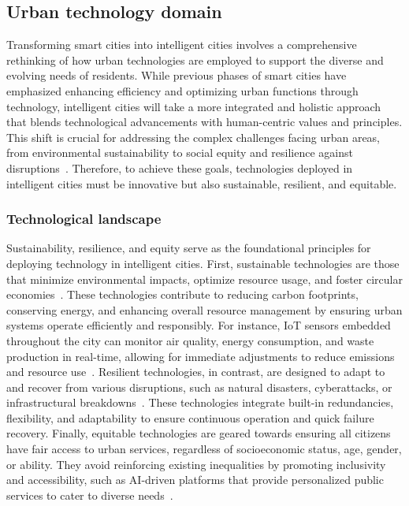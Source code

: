 \documentclass[smartcities,article,submit,pdftex,moreauthors]{Definitions/mdpi}
\begin{document}
\subsection{Urban technology domain}
Transforming smart cities into intelligent cities involves a comprehensive rethinking of how urban technologies are employed to support the diverse and evolving needs of residents. While previous phases of smart cities have emphasized enhancing efficiency and optimizing urban functions through technology, intelligent cities will take a more integrated and holistic approach that blends technological advancements with human-centric values and principles. This shift is crucial for addressing the complex challenges facing urban areas, from environmental sustainability to social equity and resilience against disruptions~\cite{kirimtatFutureTrendsCurrent2020,Trindade2017,singhDecadeReviewSmart2022}. Therefore, to achieve these goals, technologies deployed in intelligent cities must be innovative but also sustainable, resilient, and equitable.

\subsubsection{Technological landscape}

Sustainability, resilience, and equity serve as the foundational principles for deploying technology in intelligent cities. First, sustainable technologies are those that minimize environmental impacts, optimize resource usage, and foster circular economies~\cite{Hu2018,SustainableEnegy1}. These technologies contribute to reducing carbon footprints, conserving energy, and enhancing overall resource management by ensuring urban systems operate efficiently and responsibly. For instance, IoT sensors embedded throughout the city can monitor air quality, energy consumption, and waste production in real-time, allowing for immediate adjustments to reduce emissions and resource use~\cite{zengSensorsInternetThings2024,SensorsSustainable2021}. Resilient technologies, in contrast, are designed to adapt to and recover from various disruptions, such as natural disasters, cyberattacks, or infrastructural breakdowns~\cite{resilienceSC1,ReliabilityDetectability_CCF_EMS}. These technologies integrate built-in redundancies, flexibility, and adaptability to ensure continuous operation and quick failure recovery. Finally, equitable technologies are geared towards ensuring all citizens have fair access to urban services, regardless of socioeconomic status, age, gender, or ability. They avoid reinforcing existing inequalities by promoting inclusivity and accessibility, such as AI-driven platforms that provide personalized public services to cater to diverse needs~\cite{ButtazzoniEquitySC}.
\end{document}
